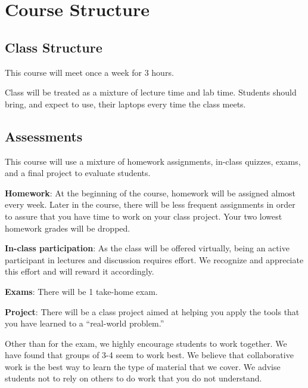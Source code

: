 \documentclass[11pt]{article}
\begin{document}
%
%
\section*{Course Structure}

  \subsection*{Class Structure}

    This course will meet once a week for 3 hours.

    \bigskip

    \noindent Class will be treated as a mixture of lecture time and lab time.
    Students should bring, and expect to use, their laptops every time the class
    meets.


  \subsection*{Assessments}

    This course will use a mixture of homework assignments, in-class quizzes,
    exams, and a final project to evaluate students.

    \bigskip

    \noindent \textbf{Homework}:  At the beginning of the course, homework  will
    be assigned almost every week. Later in the course, there will be less
    frequent assignments in order to assure that you have time to work on your
    class project. Your two lowest homework grades will be dropped.

    \noindent \textbf{In-class participation}: As the class will be offered virtually,
    being an active participant in lectures and discussion requires effort. We recognize
    and appreciate this effort and will reward it accordingly.

    \noindent \textbf{Exams}: There will be 1 take-home exam.

    \noindent \textbf{Project}: There will be a class project aimed at helping
    you apply the tools that you have learned to a ``real-world problem.''

    \vspace{5mm}

    \noindent Other than for the exam, we highly encourage students to
    work together. We have found that groups of 3-4 seem to work best. We
    believe that collaborative work is the best way to learn the type of
    material that we cover.  We advise  students not to rely on others to do
    work that you do not understand.
\end{document}
